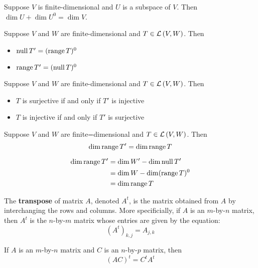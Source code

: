 \begin{theorem}
   Suppose $V$ is finite-dimensional and $U$ is a subspace of $V$.
   Then $\dim U + \dim U^0 = \dim V$.
\end{theorem}

\begin{theorem}
   Suppose $V$ and $W$ are finite-dimensional and $T \in \mathcal{L} \left( V, W \right)$. Then
   \begin{itemize}
      \item $\operatorname{null} T' = (\operatorname{range} T)^0$
      \item $\operatorname{range} T' = (\operatorname{null} T)^0$
   \end{itemize}
\end{theorem}

\begin{theorem} 
   Suppose $V$ and $W$ are finite-dimensional and $T \in \mathcal{L} \left( V, W \right)$. Then
   \begin{itemize}
      \item $T$ is surjective if and only if $T'$ is injective
      \item $T$ is injective if and only if $T'$ is surjective
   \end{itemize}
\end{theorem}

\begin{theorem}
   Suppose $V$ and $W$ are finite=dimensional and $T \in \mathcal{L} \left( V, W \right)$. Then
   \[ \dim \operatorname{range} T' = \dim \operatorname{range} T \]

   \begin{proof*}
      \begin{align*}
         \dim \operatorname{range} T' &= \dim W' - \dim \operatorname{null} T' \\
         &= \dim W - \dim(\operatorname{range} T)^0 \\
         &= \dim \operatorname{range} T
      \end{align*}
   \end{proof*}
\end{theorem}

\begin{definition} [Transpose]
   The \textbf{transpose} of matrix $A$, denoted $A^t$, is the matrix
   obtained from $A$ by interchanging the rows and columns. More specificially,
   if $A$ is an $m$-by-$n$ matrix, then $A^t$ is the $n$-by-$m$ matrix whose entries are
   given by the equation:
   \[ (A^t)_{k,j} = A_{j,k} \]
\end{definition}

\begin{theorem}
   If $A$ is an $m$-by-$n$ matrix and $C$ is an $n$-by-$p$ matrix, then
   \[ (AC)^t = C^t A^t \]
\end{theorem}

